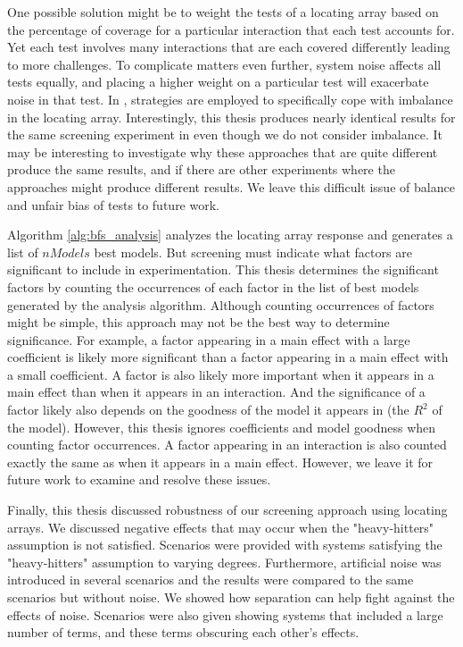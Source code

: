 One possible solution might be to weight the tests of a locating array based on the percentage of coverage for a particular interaction that each test accounts for.
Yet each test involves many interactions that are each covered differently leading to more challenges.
To complicate matters even further, system noise affects all tests equally, and placing a higher weight on a particular test will exacerbate noise in that test.
In \cite{AldacoCS15}, strategies are employed to specifically cope with imbalance in the locating array.
Interestingly, this thesis produces nearly identical results for the same screening experiment in \cite{AldacoCS15} even though we do not consider imbalance.
It may be interesting to investigate why these approaches that are quite different produce the same results, and if there are other experiments where the approaches might produce different results.
We leave this difficult issue of balance and unfair bias of tests to future work.

Algorithm \ref{alg:bfs_analysis} analyzes the locating array response and generates a list of $nModels$ best models.
But screening must indicate what factors are significant to include in experimentation.
This thesis determines the significant factors by counting the occurrences of each factor in the list of best models generated by the analysis algorithm.
Although counting occurrences of factors might be simple, this approach may not be the best way to determine significance.
For example, a factor appearing in a main effect with a large coefficient is likely more significant than a factor appearing in a main effect with a small coefficient.
A factor is also likely more important when it appears in a main effect than when it appears in an interaction.
And the significance of a factor likely also depends on the goodness of the model it appears in (the $R^2$ of the model).
However, this thesis ignores coefficients and model goodness when counting factor occurrences.
A factor appearing in an interaction is also counted exactly the same as when it appears in a main effect.
However, we leave it for future work to examine and resolve these issues.

Finally, this thesis discussed robustness of our screening approach using locating arrays.
We discussed negative effects that may occur when the "heavy-hitters" assumption is not satisfied.
Scenarios were provided with systems satisfying the "heavy-hitters" assumption to varying degrees.
Furthermore, artificial noise was introduced in several scenarios and the results were compared to the same scenarios but without noise.
We showed how separation can help fight against the effects of noise.
Scenarios were also given showing systems that included a large number of terms, and these terms obscuring each other's effects.
